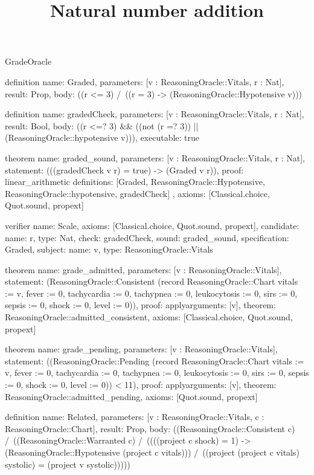 \begin{lexlean}{GradeOracle}
\title{Natural number addition}
\begin{semanticmodule}
definition{
  name: Graded,
  parameters: [v : ReasoningOracle::Vitals, r : Nat],
  result: Prop,
  body: ((r <= 3) /\ ((r = 3) -> (ReasoningOracle::Hypotensive v)))
}

definition{
  name: gradedCheck,
  parameters: [v : ReasoningOracle::Vitals, r : Nat],
  result: Bool,
  body: ((r <=? 3) && ((not (r =? 3)) || (ReasoningOracle::hypotensive v))),
  executable: true
}

theorem{
  name: graded_sound,
  parameters: [v : ReasoningOracle::Vitals, r : Nat],
  statement: (((gradedCheck v r) = true) -> (Graded v r)),
  proof: linear_arithmetic{
    definitions: [Graded, ReasoningOracle::Hypotensive, ReasoningOracle::hypotensive, gradedCheck]
  },
  axioms: [Classical.choice, Quot.sound, propext]
}

verifier{
  name: Scale,
  axioms: [Classical.choice, Quot.sound, propext],
  candidate: {name: r, type: Nat},
  check: gradedCheck,
  sound: graded_sound,
  specification: Graded,
  subject: {name: v, type: ReasoningOracle::Vitals}
}

theorem{
  name: grade_admitted,
  parameters: [v : ReasoningOracle::Vitals],
  statement: (ReasoningOracle::Consistent (record ReasoningOracle::Chart {vitals := v, fever := 0, tachycardia := 0, tachypnea := 0, leukocytosis := 0, sirs := 0, sepsis := 0, shock := 0, level := 0})),
  proof: apply{arguments: [v], theorem: ReasoningOracle::admitted_consistent},
  axioms: [Classical.choice, Quot.sound, propext]
}

theorem{
  name: grade_pending,
  parameters: [v : ReasoningOracle::Vitals],
  statement: ((ReasoningOracle::Pending (record ReasoningOracle::Chart {vitals := v, fever := 0, tachycardia := 0, tachypnea := 0, leukocytosis := 0, sirs := 0, sepsis := 0, shock := 0, level := 0})) < 11),
  proof: apply{arguments: [v], theorem: ReasoningOracle::admitted_pending},
  axioms: [Quot.sound, propext]
}

definition{
  name: Related,
  parameters: [v : ReasoningOracle::Vitals, c : ReasoningOracle::Chart],
  result: Prop,
  body: ((ReasoningOracle::Consistent c) /\ ((ReasoningOracle::Warranted c) /\ ((((project c shock) = 1) -> (ReasoningOracle::Hypotensive (project c vitals))) /\ ((project (project c vitals) systolic) = (project v systolic)))))
}


\end{semanticmodule}
\end{lexlean}
